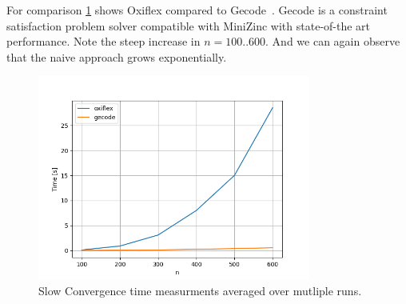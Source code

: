 For comparison \cref{fig:slow:gecode} shows Oxiflex compared to Gecode~\cite{gecode}. Gecode is a constraint satisfaction problem solver compatible with MiniZinc with state-of-the art performance. Note the steep increase in $n = 100..600$. And we can again observe that the naive approach grows exponentially.

\begin{figure}[ht]
	\centering
	\includegraphics[width=0.8\textwidth]{./Problems/slow_convergence/plots/gecode.png}
	\caption{Slow Convergence time measurments averaged over mutliple runs.}
	\label{fig:slow:gecode}
\end{figure}
